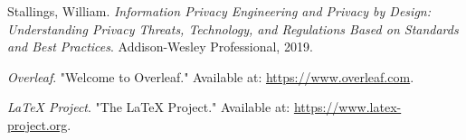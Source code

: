 \clearpage
\begin{thebibliography}{99}

Stallings, William. \textit{Information Privacy Engineering and Privacy by Design: Understanding Privacy Threats, Technology, and Regulations Based on Standards and Best Practices}. Addison-Wesley Professional, 2019.

\textit{Overleaf}. "Welcome to Overleaf." Available at: \url{https://www.overleaf.com}.

\textit{LaTeX Project}. "The LaTeX Project." Available at: \url{https://www.latex-project.org}.

\end{thebibliography}
